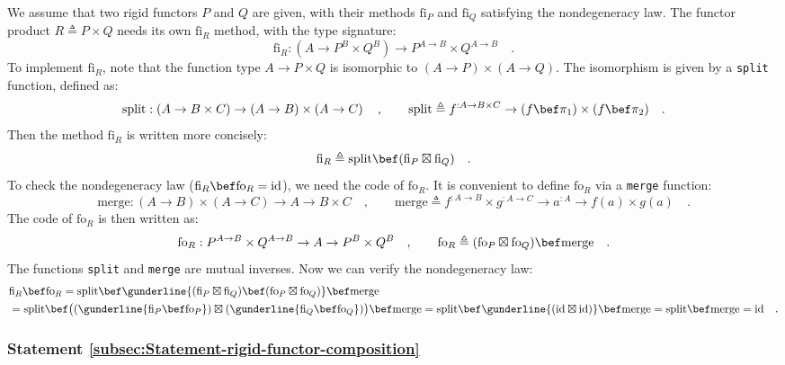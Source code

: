 We assume that two rigid functors $P$ and $Q$ are given, with their
methods $\text{fi}_{P}$ and $\text{fi}_{Q}$ satisfying the nondegeneracy
law. The functor product $R\triangleq P\times Q$ needs its own $\text{fi}_{R}$
method, with the type signature:
\[
\text{fi}_{R}:(A\rightarrow P^{B}\times Q^{B})\rightarrow P^{A\rightarrow B}\times Q^{A\rightarrow B}\quad.
\]
To implement $\text{fi}_{R}$, note that the function type $A\rightarrow P\times Q$
is isomorphic to $\left(A\rightarrow P\right)\times\left(A\rightarrow Q\right)$.
The isomorphism is given by a \lstinline!split! function, defined
as:
\[
\text{split}:\left(A\rightarrow B\times C\right)\rightarrow\left(A\rightarrow B\right)\times\left(A\rightarrow C\right)\quad,\quad\quad\text{split}\triangleq f^{:A\rightarrow B\times C}\rightarrow(f\bef\pi_{1})\times(f\bef\pi_{2})\quad.
\]
Then the method $\text{fi}_{R}$ is written more concisely:
\[
\text{fi}_{R}\triangleq\text{split}\bef(\text{fi}_{P}\boxtimes\text{fi}_{Q})\quad.
\]
To check the nondegeneracy law ($\text{fi}_{R}\bef\text{fo}_{R}=\text{id}$),
we need the code of $\text{fo}_{R}$. It is convenient to define $\text{fo}_{R}$
via a \lstinline!merge! function:
\[
\text{merge}:\left(A\rightarrow B\right)\times\left(A\rightarrow C\right)\rightarrow A\rightarrow B\times C\quad,\quad\quad\text{merge}\triangleq f^{:A\rightarrow B}\times g^{:A\rightarrow C}\rightarrow a^{:A}\rightarrow f(a)\times g(a)\quad.
\]
The code of $\text{fo}_{R}$ is then written as:
\[
\text{fo}_{R}:P^{A\rightarrow B}\times Q^{A\rightarrow B}\rightarrow A\rightarrow P^{B}\times Q^{B}\quad,\quad\quad\text{fo}_{R}\triangleq(\text{fo}_{P}\boxtimes\text{fo}_{Q})\bef\text{merge}\quad.
\]
The functions \lstinline!split! and \lstinline!merge! are mutual
inverses. Now we can verify the nondegeneracy law:
\begin{align*}
 & \text{fi}_{R}\bef\text{fo}_{R}=\text{split}\bef\gunderline{(\text{fi}_{P}\boxtimes\text{fi}_{Q})\bef(\text{fo}_{P}\boxtimes\text{fo}_{Q})}\bef\text{merge}\\
 & =\text{split}\bef\big((\gunderline{\text{fi}_{P}\bef\text{fo}_{P}})\boxtimes(\gunderline{\text{fi}_{Q}\bef\text{fo}_{Q}})\big)\bef\text{merge}=\text{split}\bef\gunderline{(\text{id}\boxtimes\text{id})}\bef\text{merge}=\text{split}\bef\text{merge}=\text{id}\quad.
\end{align*}


\subsubsection{Statement \label{subsec:Statement-rigid-functor-composition}\ref{subsec:Statement-rigid-functor-composition}}

